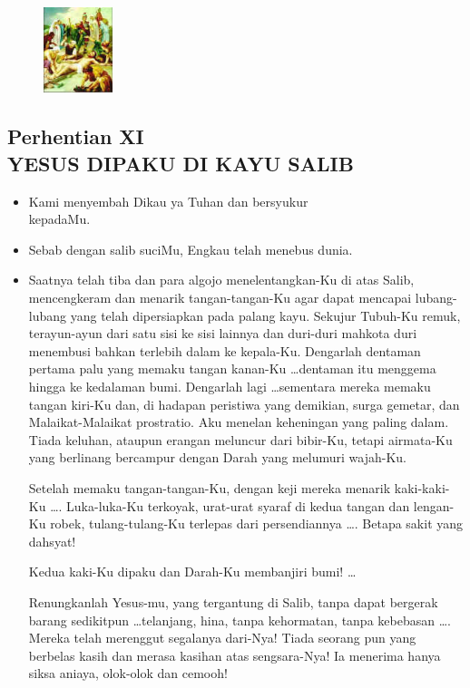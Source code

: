 \documentclass[a5paper,headsepline,titlepage,10pt,nnormalheadings,DIVcalc]{scrbook}
\newcommand{\BU}[1]{\begin{itemize} \item[U:] #1 \end{itemize}}
\newcommand{\BP}[1]{\begin{itemize} \item[P:] #1 \end{itemize}}
\newcommand{\kamiMenyembah}{\BP{ Kami menyembah Dikau ya Tuhan dan bersyukur\\kepadaMu.}
\BU{ Sebab dengan salib suciMu, Engkau telah menebus dunia.}
}
\begin{document}
\begin{figure}
\includegraphics[width=2cm]{jalansalib_files/11_small.jpg}
\end{figure}
\subsection*{Perhentian XI\\
YESUS DIPAKU DI KAYU SALIB}

\kamiMenyembah
\BP{	
Saatnya telah tiba dan para algojo menelentangkan-Ku di atas Salib, mencengkeram dan menarik tangan-tangan-Ku agar dapat mencapai lubang-lubang yang telah dipersiapkan pada palang kayu. Sekujur Tubuh-Ku remuk, terayun-ayun dari satu sisi ke sisi lainnya dan duri-duri mahkota duri menembusi bahkan terlebih dalam ke kepala-Ku. Dengarlah dentaman pertama palu yang memaku tangan kanan-Ku  \dots  dentaman itu menggema hingga ke kedalaman bumi. Dengarlah lagi  \dots  sementara mereka memaku tangan kiri-Ku dan, di hadapan peristiwa yang demikian, surga gemetar, dan Malaikat-Malaikat prostratio. Aku menelan keheningan yang paling dalam. Tiada keluhan, ataupun erangan meluncur dari bibir-Ku, tetapi airmata-Ku yang berlinang bercampur dengan Darah yang melumuri wajah-Ku.

Setelah memaku tangan-tangan-Ku, dengan keji mereka menarik kaki-kaki-Ku \dots . Luka-luka-Ku terkoyak, urat-urat syaraf di kedua tangan dan lengan-Ku robek, tulang-tulang-Ku terlepas dari persendiannya \dots . Betapa sakit yang dahsyat!

Kedua kaki-Ku dipaku dan Darah-Ku membanjiri bumi!  \dots 

Renungkanlah Yesus-mu, yang tergantung di Salib, tanpa dapat bergerak barang sedikitpun \dots  telanjang, hina, tanpa kehormatan, tanpa kebebasan \dots . Mereka telah merenggut segalanya dari-Nya! Tiada seorang pun yang berbelas kasih dan merasa kasihan atas sengsara-Nya! Ia menerima hanya siksa aniaya, olok-olok dan cemooh!}
\end{document}
